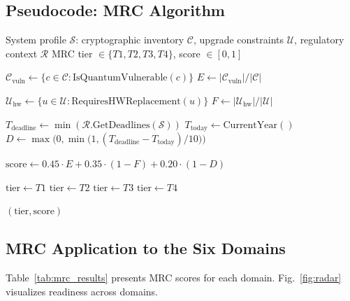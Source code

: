 \documentclass[journal]{IEEEtran}
\begin{document}
\subsection{Pseudocode: MRC Algorithm}

\begin{algorithm}[t]
\caption{MRC Scoring Algorithm}
\label{alg:mrc}
\begin{algorithmic}[1]
\REQUIRE System profile $\mathcal{S}$: cryptographic inventory $\mathcal{C}$,
  upgrade constraints $\mathcal{U}$, regulatory context $\mathcal{R}$
\ENSURE MRC tier $\in \{T1, T2, T3, T4\}$, score $\in [0,1]$

\STATE $\mathcal{C}_{\text{vuln}} \leftarrow \{c \in \mathcal{C} : \text{IsQuantumVulnerable}(c)\}$
\STATE $E \leftarrow |\mathcal{C}_{\text{vuln}}| / |\mathcal{C}|$

\STATE $\mathcal{U}_{\text{hw}} \leftarrow \{u \in \mathcal{U} : \text{RequiresHWReplacement}(u)\}$
\STATE $F \leftarrow |\mathcal{U}_{\text{hw}}| / |\mathcal{U}|$

\STATE $T_{\text{deadline}} \leftarrow \min(\mathcal{R}.\text{GetDeadlines}(\mathcal{S}))$
\STATE $T_{\text{today}} \leftarrow \text{CurrentYear}()$
\STATE $D \leftarrow \max\bigl(0, \min\bigl(1, (T_{\text{deadline}} - T_{\text{today}}) / 10\bigr)\bigr)$

\STATE $\text{score} \leftarrow 0.45 \cdot E + 0.35 \cdot (1 - F) + 0.20 \cdot (1 - D)$

  \STATE $\text{tier} \leftarrow T1$ 
  \STATE $\text{tier} \leftarrow T2$ 
  \STATE $\text{tier} \leftarrow T3$ 
\ELSE
  \STATE $\text{tier} \leftarrow T4$ 
\ENDIF

\RETURN $(\text{tier}, \text{score})$
\end{algorithmic}
\end{algorithm}

\subsection{MRC Application to the Six Domains}

Table~\ref{tab:mrc_results} presents MRC scores for each domain.
Fig.~\ref{fig:radar} visualizes readiness across domains.
\end{document}
